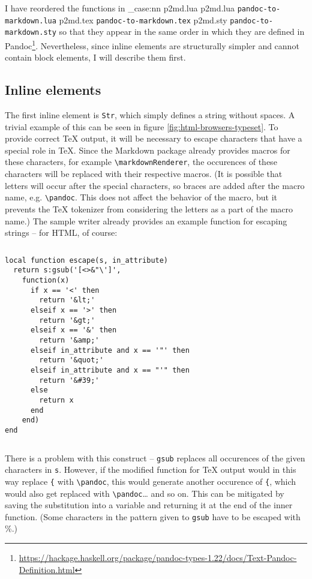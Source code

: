\documentclass[
  digital,     %
  oneside,     %
  nosansbold,  %
  nocolorbold, %
  lof,         %
  nolot,       %
]{fithesis4}
\newcommand\macro[1]{\texttt{\textbackslash{}{#1}}}
\newcommand\pandoc[1]{\macro{pandoc\-{#1}}}
\newcommand\renderer[1]{\macro{markdown\-Renderer\-{#1}}}
\newcommand\file[1]
  {
    \str_case:nn
      { #1 }
      {
        { p2md.lua } { \texttt{pandoc\hyp{}to\hyp{}markdown.lua} }
        { p2md.tex } { \texttt{pandoc\hyp{}to\hyp{}markdown.tex} }
        { p2md.sty } { \texttt{pandoc\hyp{}to\hyp{}markdown.sty} }
      }
  }
\begin{document}
I have reordered the functions in \file{p2md.lua} so that they appear in the same order in which they are defined in Pandoc\footnote{\url{https://hackage.haskell.org/package/pandoc-types-1.22/docs/Text-Pandoc-Definition.html}}. Nevertheless, since inline elements are structurally simpler and cannot contain block elements, I will describe them first.

\subsection{Inline elements}

The first inline element is \texttt{Str}, which simply defines a string without spaces. A trivial example of this can be seen in figure \ref{fig:html-browsers-typeset}. To provide correct \TeX{} output, it will be necessary to escape characters that have a special role in \TeX{}. Since the Markdown package already provides macros for these characters, for example \renderer{Backslash}, the occurences of these characters will be replaced with their respective macros. (It is possible that letters will occur after the special characters, so braces are added after the macro name, e.g. \pandoc{Backslash\{\}}. This does not affect the behavior of the macro, but it prevents the \TeX{} tokenizer from considering the letters as a part of the macro name.) The sample writer already provides an example function for escaping strings -- for HTML, of course:

$ $

\noindent
\lstset{language=[5.3]Lua}
\begin{lstlisting}
local function escape(s, in_attribute)
  return s:gsub('[<>&"\']',
    function(x)
      if x == '<' then
        return '&lt;'
      elseif x == '>' then
        return '&gt;'
      elseif x == '&' then
        return '&amp;'
      elseif in_attribute and x == '"' then
        return '&quot;'
      elseif in_attribute and x == "'" then
        return '&#39;'
      else
        return x
      end
    end)
end
\end{lstlisting}

$ $

\noindent
There is a problem with this construct -- \texttt{gsub} replaces all occurences of the given characters in \texttt{s}. However, if the modified function for \TeX{} output would in this way replace \texttt{\{} with \pandoc{LeftBrace\{\}}, this would generate another occurence of \texttt{\{}, which would also get replaced with \pandoc{LeftBrace\{\}}\dots{} and so on. This can be mitigated by saving the substitution into a variable and returning it at the end of the inner function. (Some characters in the pattern given to \texttt{gsub} have to be escaped with \%.)
\end{document}
